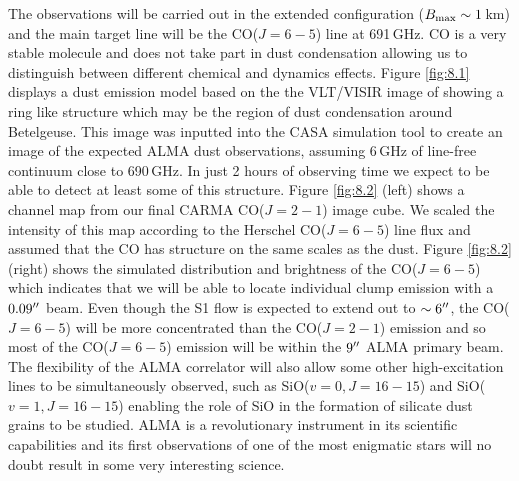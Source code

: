 The observations will be carried out in the extended configuration ($B_{\rm{max}} \sim 1\,$km) and the main target line will be the CO($J=6-5$) line at 691\,GHz. CO is a very stable molecule and does not take part in dust condensation allowing us to distinguish between different chemical and dynamics effects. Figure \ref{fig:8.1} displays a dust emission model based on the the VLT/VISIR image of \cite{kervella_2011} showing a ring like structure which may be the region of dust condensation around Betelgeuse. This image was inputted into the CASA simulation tool to create an image of the expected ALMA dust observations, assuming 6\,GHz of line-free continuum close to 690\,GHz. In just 2 hours of observing time we expect to be able to detect at least some of this structure. Figure \ref{fig:8.2} (left) shows a channel map from our final CARMA CO($J=2-1$) image cube. We scaled the intensity of this map according to the Herschel CO($J=6-5$) line flux and assumed that the CO has structure on the same scales as the dust. Figure \ref{fig:8.2} (right) shows the simulated distribution and brightness of the CO($J=6-5$) which indicates that we will be able to locate individual clump emission with a $0.09^{\prime\prime}$ beam. Even though the S1 flow is expected to extend out to $\sim 6^{\prime\prime}$, the CO($J=6-5$) will be more concentrated than the CO($J=2-1$) emission and so most of the  CO($J=6-5$) emission will be within the $9^{\prime\prime}$ ALMA primary beam. The flexibility of the ALMA correlator will also allow some other high-excitation lines to be simultaneously observed, such as SiO($v=0, J=16-15$) and SiO($v=1,J=16-15$) enabling the role of SiO in the formation of silicate dust grains to be studied. ALMA is a revolutionary instrument in its scientific capabilities and its first observations of one of the most enigmatic stars will no doubt result in some very interesting science.


